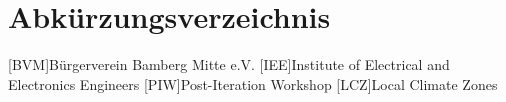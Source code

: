 \chapter*{Abkürzungsverzeichnis}

\begin{acronym}
    [BVM]{Bürgerverein Bamberg Mitte e.V.}
    [IEE]{Institute of Electrical and Electronics Engineers}
    [PIW]{Post-Iteration Workshop}
    [LCZ]{Local Climate Zones}
\end{acronym}